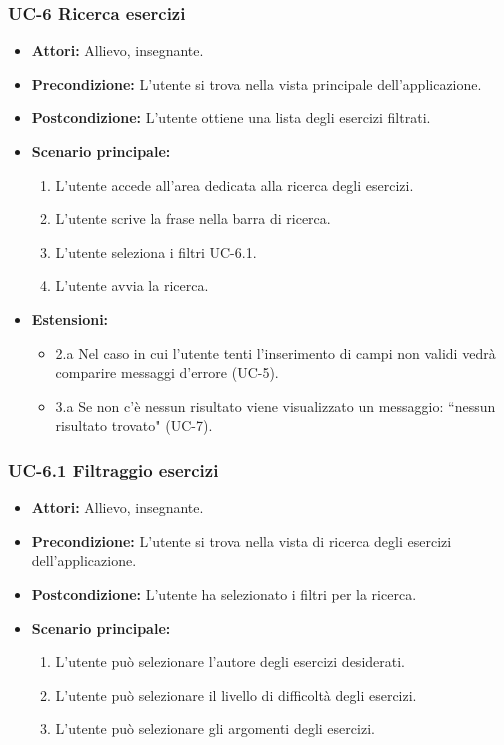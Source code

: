 \subsubsection{UC-6 Ricerca esercizi}
		\begin{itemize}
			\item\textbf{ Attori:} Allievo, insegnante.
			\item \textbf{Precondizione:} L'utente si trova nella vista principale dell'applicazione.
			\item \textbf{Postcondizione:} L'utente ottiene una lista degli esercizi filtrati.
			\item \textbf{Scenario principale:}
				\begin{enumerate}
					\item L'utente accede all'area dedicata alla ricerca degli esercizi.
					\item L'utente scrive la frase nella barra di ricerca.
					\item L'utente seleziona i filtri UC-6.1.
					\item L'utente avvia la ricerca.
				\end{enumerate}
			\item \textbf{Estensioni:}
				\begin{itemize}
					\item 2.a Nel caso in cui l'utente tenti l'inserimento di campi non validi vedrà comparire messaggi d'errore (UC-5).
					\item 3.a Se non c'è nessun risultato viene visualizzato un messaggio: ``nessun risultato trovato" (UC-7).
				\end{itemize}
		\end{itemize}
\subsubsection{UC-6.1 Filtraggio esercizi }
\begin{itemize}
\item \textbf{Attori:} Allievo, insegnante.
			\item \textbf{Precondizione:} L'utente si trova nella vista di ricerca degli esercizi dell'applicazione.
			\item \textbf{Postcondizione:} L'utente ha selezionato i filtri per la ricerca.
			\item \textbf{Scenario principale:}
				\begin{enumerate}
					\item L'utente può selezionare l'autore degli esercizi desiderati.
					\item L'utente può selezionare il livello di difficoltà degli esercizi.
					\item L'utente può selezionare gli argomenti degli esercizi.
				\end{enumerate}

\end{itemize}
